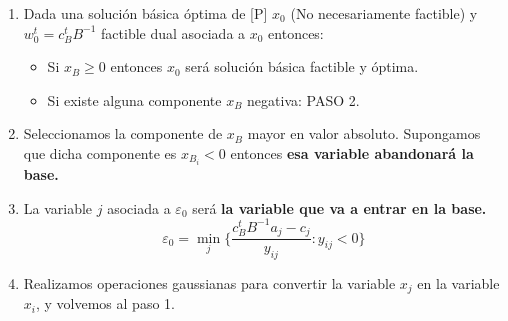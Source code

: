 \documentclass[11pt,fleqn]{book} %
\begin{document}
\begin{itemize}
	\begin{enumerate}
		\item Dada una solución básica óptima de [P] $x_0$ (No necesariamente factible) y $w_0^t=c_B^t B^{-1}$ factible dual asociada a $x_0$ entonces:
		\begin{itemize}
			\item Si $x_B\geq0$ entonces $x_0$ será solución básica factible y óptima.
			\item Si existe alguna componente $x_B$ negativa: PASO 2.
		\end{itemize}
		\item Seleccionamos la componente de $x_B$ mayor en valor absoluto. Supongamos que dicha componente es $x_{B_i}<0$ entonces \textbf{esa variable abandonará la base.}
		\item La variable $j$ asociada a $\varepsilon_0$ será \textbf{la variable que va a entrar en la base.}
		$$
			\varepsilon_0=\min_j \{\frac{c_B^tB^{-1}a_j-c_j}{y_{ij}}: y_{ij}< 0\}
		$$
		\item Realizamos operaciones gaussianas para convertir la variable $x_j$ en la variable $x_i$, y volvemos al paso 1.
	\end{enumerate}
\end{itemize}
\end{document}
